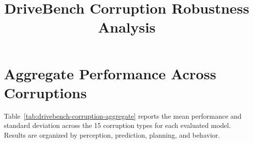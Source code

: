 \documentclass[10pt]{article}
\title{DriveBench Corruption Robustness Analysis}
\author{}
\date{}
\begin{document}
\maketitle

\section{Aggregate Performance Across Corruptions}

Table~\ref{tab:drivebench-corruption-aggregate}
reports the mean performance and standard deviation across the
15 corruption types for each evaluated model. Results are
organized by perception, prediction, planning, and behavior.


\end{document}
